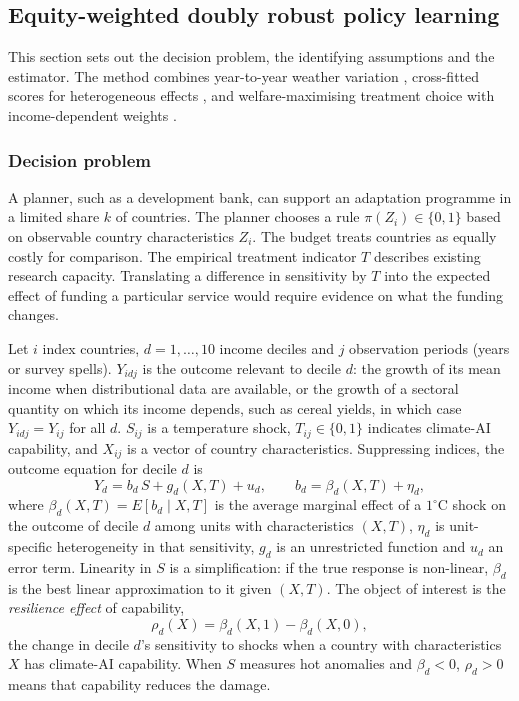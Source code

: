 \subsection{Equity-weighted doubly robust policy learning}\label{sec:method}

This section sets out the decision problem, the identifying assumptions and the estimator. The
method combines year-to-year weather variation \citep{dell2012,burke2015,hsiang2016},
cross-fitted scores for heterogeneous effects \citep{robinson1988,chernozhukov2018}, and
welfare-maximising treatment choice with income-dependent weights
\citep{manski2004,kitagawa2018,athey2021,atkinson1970,kitagawa2021}.

\subsubsection{Decision problem}

A planner, such as a development bank, can support an adaptation programme in a limited
share $k$ of countries. The planner chooses a rule $\pi(Z_i)\in\{0,1\}$ based on observable
country characteristics $Z_i$. The budget treats countries as equally costly for comparison.
The empirical treatment indicator $T$ describes existing research capacity. Translating a
difference in sensitivity by $T$ into the expected effect of funding a particular service
would require evidence on what the funding changes.

Let $i$ index countries, $d=1,\dots,10$ income deciles and $j$ observation periods (years or
survey spells). $Y_{idj}$ is the outcome relevant to decile $d$: the growth of its mean income when
distributional data are available, or the growth of a sectoral quantity on which its income
depends, such as cereal yields, in which case $Y_{idj}=Y_{ij}$ for all $d$. $S_{ij}$ is a
temperature shock,
$T_{ij}\in\{0,1\}$ indicates climate-AI capability, and $X_{ij}$ is a vector of country
characteristics. Suppressing indices, the outcome equation for decile $d$ is
\begin{equation}\label{eq:model}
Y_d = b_d\,S + g_d(X,T) + u_d, \qquad b_d = \beta_d(X,T) + \eta_d ,
\end{equation}
where $\beta_d(X,T)=E[b_d\mid X,T]$ is the average marginal effect of a $1^{\circ}$C shock on the
outcome of decile $d$ among units with characteristics $(X,T)$, $\eta_d$ is unit-specific
heterogeneity in that sensitivity, $g_d$ is an unrestricted function and $u_d$ an error term.
Linearity in $S$ is a simplification: if the true response is non-linear, $\beta_d$ is the best
linear approximation to it given $(X,T)$. The object of interest is the \emph{resilience effect} of capability,
\begin{equation}\label{eq:rho}
\rho_d(X) = \beta_d(X,1) - \beta_d(X,0),
\end{equation}
the change in decile $d$'s sensitivity to shocks when a country with characteristics $X$ has
climate-AI capability. When $S$ measures hot anomalies and $\beta_d<0$, $\rho_d>0$ means that
capability reduces the damage.

